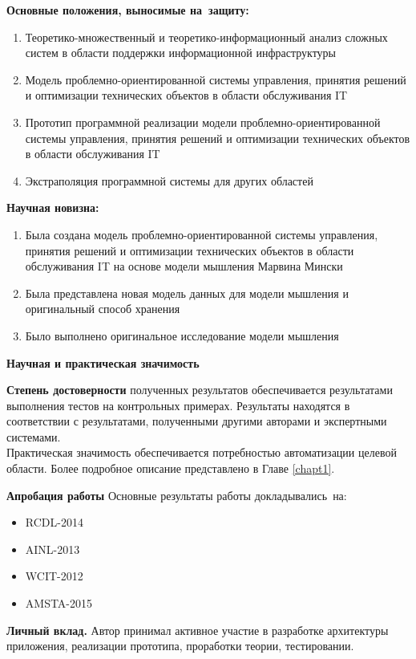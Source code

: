 \textbf{Основные положения, выносимые на~защиту:}
\begin{enumerate}
  \item Теоретико-множественный и теоретико-информационный анализ сложных систем в области поддержки информационной инфраструктуры
  \item Модель проблемно-ориентированной системы управления, принятия решений и оптимизации технических объектов в области обслуживания IT  
  \item Прототип программной реализации модели проблемно-ориентированной системы управления, принятия решений и оптимизации технических объектов в области обслуживания IT  
  \item Экстраполяция программной системы для других областей
\end{enumerate}

\textbf{Научная новизна:}
\begin{enumerate}
  \item Была создана модель проблемно-ориентированной системы управления, принятия решений и оптимизации технических объектов в области обслуживания IT на основе модели мышления Марвина Мински
  \item Была представлена новая модель данных для модели мышления и оригинальный способ хранения 
  \item Было выполнено оригинальное исследование модели мышления 
\end{enumerate}

\textbf{Научная и практическая значимость} 

\textbf{Степень достоверности} полученных результатов обеспечивается результатами выполнения тестов на контрольных примерах. Результаты находятся в соответствии с результатами, полученными другими авторами и экспертными системами. \\
Практическая значимость обеспечивается потребностью автоматизации целевой области. Более подробное описание представлено в Главе \ref{chapt1}.

\textbf{Апробация работы}
Основные результаты работы докладывались~на:
\begin{itemize}
	\item RCDL-2014
	\item AINL-2013
	\item WCIT-2012
	\item AMSTA-2015
\end{itemize}




\textbf{Личный вклад.} Автор принимал активное участие в разработке архитектуры приложения, реализации прототипа, проработки теории, тестировании.

